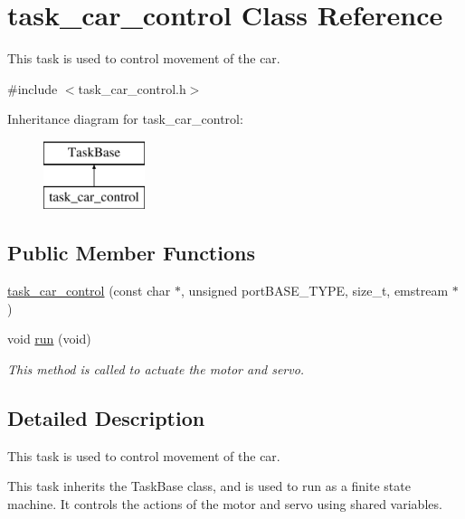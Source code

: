 \hypertarget{classtask__car__control}{}\section{task\+\_\+car\+\_\+control Class Reference}
\label{classtask__car__control}


This task is used to control movement of the car.  




{\ttfamily \#include $<$task\+\_\+car\+\_\+control.\+h$>$}

Inheritance diagram for task\+\_\+car\+\_\+control\+:\begin{figure}[H]
\begin{center}
\leavevmode
\includegraphics[height=2.000000cm]{classtask__car__control}
\end{center}
\end{figure}
\subsection*{Public Member Functions}
\begin{DoxyCompactItemize}
\item 
\mbox{\hyperlink{classtask__car__control_ae42d6364ed49d5d59a5d3dbebc8a7f38}{task\+\_\+car\+\_\+control}} (const char $\ast$, unsigned port\+B\+A\+S\+E\+\_\+\+T\+Y\+PE, size\+\_\+t, emstream $\ast$)
\item 
void \mbox{\hyperlink{classtask__car__control_a797dbdeb270271b48c468442d3ab91bd}{run}} (void)
\begin{DoxyCompactList}\small\item\em This method is called to actuate the motor and servo. \end{DoxyCompactList}\end{DoxyCompactItemize}


\subsection{Detailed Description}
This task is used to control movement of the car. 

This task inherits the Task\+Base class, and is used to run as a finite state machine. It controls the actions of the motor and servo using shared variables. 


